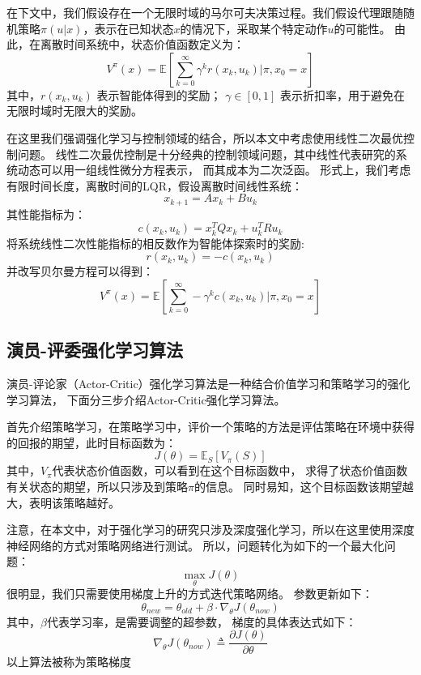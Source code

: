 \documentclass[AutoFakeBold]{LZUThesis}
\begin{document}
在下文中，我们假设存在一个无限时域的马尔可夫决策过程。我们假设代理跟随随机策略$\pi(u | x)$，表示在已知状态$x$的情况下，采取某个特定动作$u$的可能性。
由此，在离散时间系统中，状态价值函数定义为：
\begin{equation}
  V^{\pi}(x) = \mathbb{E} \left[ \sum_{k = 0}^{\infty} \gamma^k r(x_k, u_k) |
  \pi, x_0 = x \right]
\end{equation}
其中，$r(x_k, u_k)$ 表示智能体得到的奖励；
$\gamma \in [0, 1]$ 表示折扣率，用于避免在无限时域时无限大的奖励。

在这里我们强调强化学习与控制领域的结合，所以本文中考虑使用线性二次最优控制问题。
线性二次最优控制是十分经典的控制领域问题，其中线性代表研究的系统动态可以用一组线性微分方程表示，
而其成本为二次泛函。
形式上，我们考虑有限时间长度，离散时间的LQR，假设离散时间线性系统：
$$
x_{k + 1} = A x_k + B u_k
$$
其性能指标为：
\begin{equation}
  c(x_k, u_k) = x_k^T Q x_k + u_k^T R u_k
\end{equation}
将系统线性二次性能指标的相反数作为智能体探索时的奖励:
\begin{equation}
  r(x_k, u_k) = - c(x_k, u_k)
\end{equation}
并改写贝尔曼方程可以得到：
\begin{equation}
  V^{\pi}(x) = \mathbb{E} \left[ \sum_{k = 0}^{\infty} - \gamma^k c(x_k, u_k) | \pi, x_0 = x \right]
\end{equation}

\subsection{演员-评委强化学习算法}
演员-评论家（Actor-Critic）强化学习算法是一种结合价值学习和策略学习的强化学习算法，
下面分三步介绍Actor-Critic强化学习算法。

首先介绍策略学习，在策略学习中，评价一个策略的方法是评估策略在环境中获得的回报的期望，此时目标函数为：
\begin{equation}
  J(\theta) = \mathbb{E}_S\left[ V_\pi (S) \right]
\end{equation}
其中，$V_\pi$代表状态价值函数，可以看到在这个目标函数中，
求得了状态价值函数有关状态的期望，所以只涉及到策略$\pi$的信息。
同时易知，这个目标函数该期望越大，表明该策略越好。

注意，在本文中，对于强化学习的研究只涉及深度强化学习，所以在这里使用深度神经网络的方式对策略网络进行测试。
所以，问题转化为如下的一个最大化问题：
\begin{equation}
  \max_{\theta} J(\theta)
\end{equation}
很明显，我们只需要使用梯度上升的方式迭代策略网络。
参数更新如下：
\begin{equation}
  \theta_{new} = \theta_{old} + \beta \cdot \nabla_\theta J(\theta_{now})
\end{equation}
其中，$\beta$代表学习率，是需要调整的超参数，
梯度的具体表达式如下：
\begin{equation}
  \nabla_\theta J(\theta_{now}) \triangleq \frac{\partial J(\theta)}{\partial \theta}
\end{equation}
以上算法被称为策略梯度
\end{document}
